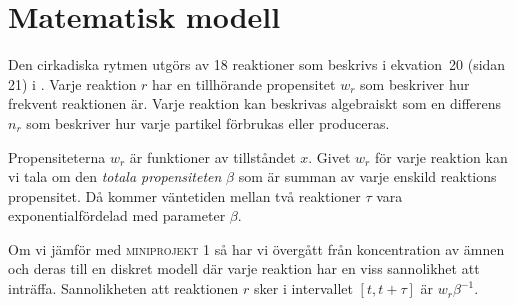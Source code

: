 \section{Matematisk modell}
\label{sec:modell}

Den cirkadiska rytmen utgörs av 18 reaktioner som beskrivs i ekvation~20 (sidan 21) i \cite{hellander}. Varje reaktion $r$ har en tillhörande propensitet $w_r$ som beskriver hur frekvent reaktionen är. Varje reaktion kan beskrivas algebraiskt som en differens $n_r$ som beskriver hur varje partikel förbrukas eller produceras.

Propensiteterna $w_r$ är funktioner av tillståndet $x$. Givet $w_r$ för varje reaktion kan vi tala om den \emph{totala propensiteten} $\beta$ som är summan av varje enskild reaktions propensitet. Då kommer väntetiden mellan två reaktioner $\tau$ vara exponentialfördelad med parameter $\beta$.

Om vi jämför med \textsc{miniprojekt 1} så har vi övergått från koncentration av ämnen och deras  till en diskret modell där varje reaktion har en viss sannolikhet att inträffa. Sannolikheten att reaktionen $r$ sker i intervallet $[t, t + \tau]$ är $w_r \beta^{-1}$.